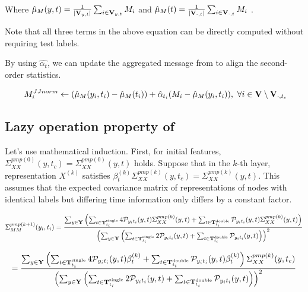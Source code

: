Where $\hat\mu_M(y,t)={1\over {\mid \bold{V}_{y,t} \mid}}\sum_{i\in \bold{V}_{y,t}}M_i$  and $\hat\mu_M(t) ={1\over {\mid \bold{V}_{\cdot,t} \mid}}\sum_{i\in \bold{V}_{\cdot,t}}M_i$ . 

Note that all three terms in the above equation can be directly computed without requiring test labels.

By using $\hat{\alpha_t}$, we can update the aggregated message from \PMP to align the second-order statistics.

\begin{align}
\ M_i^{JJnorm} \leftarrow (\hat\mu_M(y_i,t_i) -\hat\mu_M(t_i) )+\hat{\alpha}_{t_i} (M_i - \hat\mu_M(y_i,t_i)),\ \forall i \in \bold{V}\setminus\bold{V}_{\cdot,t_{c}}
\end{align}








\subsection{Lazy operation property of \JJnorm}
\label{apdx:Lazy}
Let's use mathematical induction. First, for initial features, $\Sigma_{XX}^{pmp (0)}(y,t_{c})= \Sigma_{XX}^{pmp (0)}(y,t)$ holds. Suppose that in the $k$-th layer, representation $X^{(k)}$ satisfies $\beta_{t}^{(k)}\Sigma_{XX}^{pmp (k)}(y,t_{c})= \Sigma_{XX}^{pmp (k)}(y,t)$. This assumes that the expected covariance matrix of representations of nodes with identical labels but differing time information only differs by a constant factor.

\begin{align}
\Sigma^{pmp(k+1)}_{MM}(y_i,t_i) = {\sum_{y\in \bold{Y}}\left(\sum_{t\in\bold{T}_{t_i}^{\text{single}}}4\mathcal{P}_{y_i t_i}(y, t)\Sigma^{pmp(k)}_{XX}(y,t)+\sum_{t\in\bold{T}_{t_i}^{\text{double}}}\mathcal{P}_{y_i t_i}(y, t)\Sigma^{pmp(k)}_{XX}(y,t)\right)
\over
\left(\sum_{y\in \bold{Y}}\left(\sum_{t\in\bold{T}_{t_i}^{\text{single}}}2\mathcal{P}_{y_i t_i}(y, t)+\sum_{t\in\bold{T}_{t_i}^{\text{double}}}\mathcal{P}_{y_i t_i}(y, t)\right)\right)^2}
\end{align}

\begin{align}
 = {\sum_{y\in \bold{Y}}\left(\sum_{t\in\bold{T}_{t_i}^{\text{single}}}4\mathcal{P}_{y_i t_i}(y, t)\beta_{t}^{(k)}+\sum_{t\in\bold{T}_{t_i}^{\text{double}}}\mathcal{P}_{y_i t_i}(y, t)\beta_{t}^{(k)}\right)\Sigma_{XX}^{pmp (k)}(y,t_{c})
\over
\left(\sum_{y\in \bold{Y}}\left(\sum_{t\in\bold{T}_{t_i}^{\text{single}}}2\mathcal{P}_{y_i t_i}(y, t)+\sum_{t\in\bold{T}_{t_i}^{\text{double}}}\mathcal{P}_{y_i t_i}(y, t)\right)\right)^2}
\end{align}

